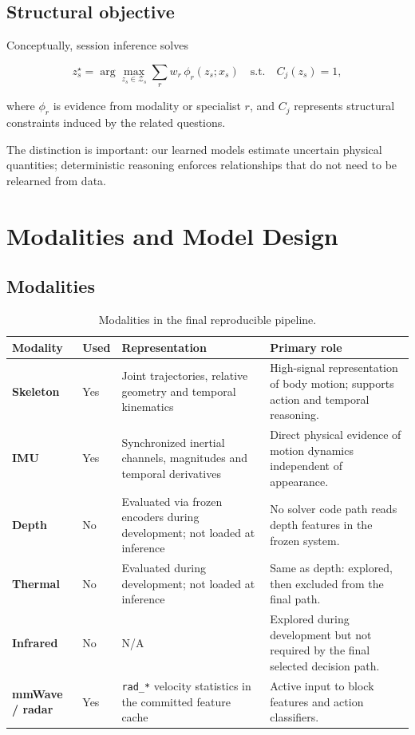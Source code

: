 \documentclass[12pt,a4paper]{article}
\begin{document}
\subsection{Structural objective}

Conceptually, session inference solves

\[
z_s^\star
=
\arg\max_{z_s\in\mathcal{Z}_s}
\sum_r
w_r\,
\phi_r(z_s;x_s)
\quad
\text{s.t.}
\quad
C_j(z_s)=1,
\]

where \(\phi_r\) is evidence from modality or specialist \(r\), and \(C_j\)
represents structural constraints induced by the related questions.

The distinction is important: our learned models estimate uncertain physical
quantities; deterministic reasoning enforces relationships that do not need to
be relearned from data.

\section{Modalities and Model Design}

\subsection{Modalities}

\begin{table}[ht]
\centering
\small
\begin{tabularx}{\textwidth}{
    >{\bfseries}p{1.55cm}
    p{1.0cm}
    p{4.1cm}
    X
}
\toprule
Modality & Used & Representation & Primary role \\
\midrule

Skeleton &
Yes &
Joint trajectories, relative geometry and temporal kinematics &
High-signal representation of body motion; supports action and temporal reasoning. \\

IMU &
Yes &
Synchronized inertial channels, magnitudes and temporal derivatives &
Direct physical evidence of motion dynamics independent of appearance. \\

Depth &
No &
Evaluated via frozen encoders during development; not loaded at inference &
No solver code path reads depth features in the frozen system. \\

Thermal &
No &
Evaluated during development; not loaded at inference &
Same as depth: explored, then excluded from the final path. \\

Infrared &
No &
N/A &
Explored during development but not required by the final selected decision path. \\

mmWave / radar &
Yes &
\texttt{rad\_*} velocity statistics in the committed feature cache &
Active input to block features and action classifiers. \\

\bottomrule
\end{tabularx}
\caption{Modalities in the final reproducible pipeline.}
\end{table}
\end{document}
